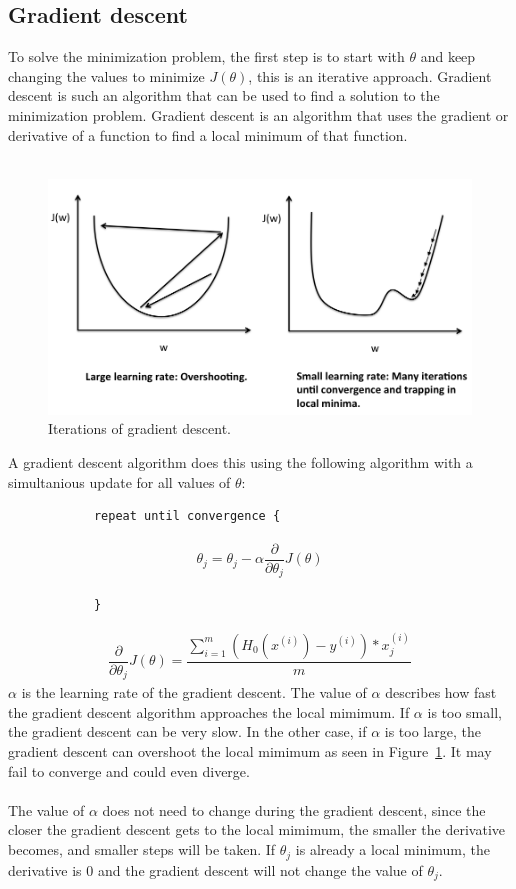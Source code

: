 \subsection{Gradient descent}
To solve the minimization problem, the first step is to start with $\theta$ and keep changing the values to minimize $J(\theta)$, this is an iterative approach.  Gradient descent is such an algorithm that can be used to find a solution to the minimization problem. Gradient descent is an algorithm that uses the gradient or derivative of a function to find a local minimum of that function. \\
\\
 \begin{figure}[H]
\centering
\includegraphics[width=1\textwidth]{Figures/gradient}
\decoRule
\caption[Gradient descent]{Iterations of gradient descent.}
\label{fig:gradient}
\end{figure}
\noindent A gradient descent algorithm does this using the following algorithm with a simultanious update for all values of $\theta$:
\begin{lstlisting}
            repeat until convergence {
 \end{lstlisting}
\begin{align}
    \theta_j = \theta_j - \alpha\dfrac{\partial}{\partial \theta_j}J(\theta)
\end{align}
\begin{lstlisting}
            }
 \end{lstlisting}
\begin{align}
\dfrac{\partial}{\partial \theta_j}J(\theta) =  \dfrac{\sum\limits_{i=1}^m(H_0(x^{(i)}) - y^{(i)}) * x_j^{(i)}}{m}
 \end{align}
 $\alpha$ is the learning rate of the gradient descent. The value of $\alpha$ describes how fast the gradient descent algorithm approaches the local mimimum. If $\alpha$ is too small, the gradient descent can be very slow. In the other case, if $\alpha$ is too large, the gradient descent can overshoot the local mimimum as seen in Figure~\ref{fig:gradient}. It may fail to converge and could even diverge. \\
 \\
The value of $\alpha$ does not need to change during the gradient descent, since the closer the gradient descent gets to the local mimimum, the smaller the derivative becomes, and smaller steps will be taken. If $\theta_j$ is already a local minimum, the derivative is $0$ and the gradient descent will not change the value of $\theta_j$.

